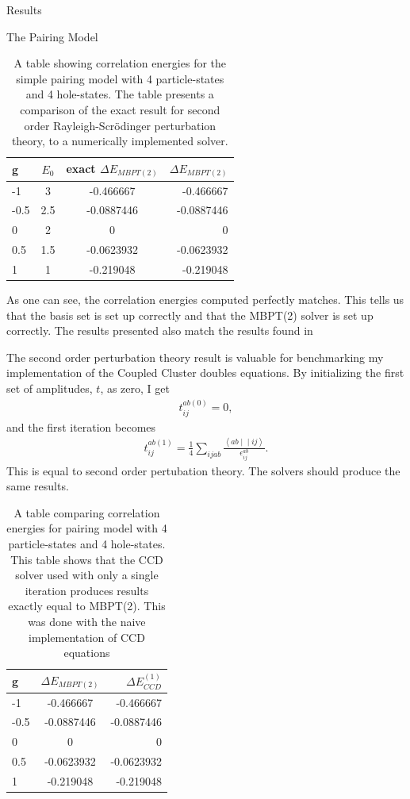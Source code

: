 \documentclass[twoside,english]{uiofysmaster}
\begin{document}
\begin{chapter}{Results}
\begin{section}{The Pairing Model}
		\begin{table}[H]
			\begin{center}
				\begin{tabular}[center]{l | c | c | r}
					g & $E_0$ & exact $ \Delta E_{MBPT(2)}$  & $\Delta E_{MBPT(2)}$ \\
					\hline
					-1 & 3 & -0.466667 & -0.466667 \\
					-0.5 & 2.5 & -0.0887446 & -0.0887446 \\
					0 & 2 & 0 & 0 \\
					0.5 & 1.5 & -0.0623932 & -0.0623932 \\
					1 & 1 & -0.219048 & -0.219048
				\end{tabular}
			\end{center}
			\caption{A table showing correlation energies for the simple pairing model with 4 particle-states and 4 hole-states. The table presents a comparison of the exact result for second order Rayleigh-Scr\"{o}dinger perturbation theory, to a numerically implemented solver. }
			\label{Results1}
		\end{table}
		As one can see, the correlation energies computed perfectly matches.  This tells us that the basis set is set up correctly and that the MBPT(2) solver is set up correctly. The results presented also match the results found in \cite{Hjorth-Jensen2016}

		The second order perturbation theory result is valuable for benchmarking my implementation of the Coupled Cluster doubles equations. By initializing the first set of amplitudes, $t$, as zero, I get
		\begin{align}
			t_{ij}^{ab(0)} = 0 , 
		\end{align}
		and the first iteration becomes 
		\begin{align}
			t_{ij}^{ab(1)} = \frac{1}{4} \sum_{ijab} \frac{\left<ab\middle|\middle|ij\right>}{\epsilon_{ij}^{ab}} .
 		\end{align}
 		This is equal to second order pertubation theory. The solvers should produce the same results.
 		\begin{table}[H]
			\begin{center}
				\begin{tabular}[center]{l | c | r}
					g & $ \Delta E_{MBPT(2)}$  & $\Delta E_{CCD}^{(1)}$ \\
					\hline
					-1 & -0.466667 & -0.466667 \\
					-0.5 & -0.0887446 & -0.0887446 \\
					0 & 0 & 0 \\
					0.5 & -0.0623932 & -0.0623932 \\
					1 & -0.219048 & -0.219048
				\end{tabular}
			\end{center}
			\caption{A table comparing correlation energies for pairing model with 4 particle-states and 4 hole-states. This table shows that the CCD solver used with only a single iteration produces results exactly equal to MBPT(2). This was done with the naive implementation of CCD equations}
			\label{Results2}
		\end{table}
		


\end{section}
\end{chapter}
\end{document}
